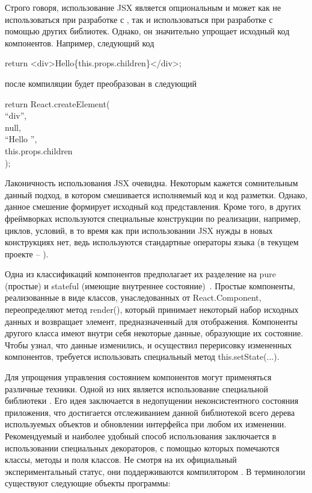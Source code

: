 Строго говоря, использование JSX является опциональным и может как не использоваться при разработке с \react, так и использоваться при разработке с помощью других библиотек. Однако, он значительно упрощает исходный код компонентов. Например, следующий \js код 
\begin{flushleft}
\qquad\qquad\qquad return <div>Hello\{this.props.children\}</div>;
\end{flushleft}
после компиляции будет преобразован в следующий
\begin{flushleft}
\qquad\qquad\qquad return React.createElement(\\
\qquad\qquad\qquad\qquad ``div'',\\
\qquad\qquad\qquad\qquad null,\\
\qquad\qquad\qquad\qquad ``Hello '',\\
\qquad\qquad\qquad\qquad this.props.children\\
\qquad\qquad\qquad );
\end{flushleft}

Лаконичность использования JSX очевидна. Некоторым кажется сомнительным данный подход, в котором смешивается исполняемый код и код разметки. Однако, данное смешение формирует исходный код представления. Кроме того, в других фреймворках используются специальные конструкции по реализации, например, циклов, условий, в то время как при использовании JSX нужды в новых конструкциях нет, ведь используются стандартные операторы языка \js (в текущем проекте -- \typescript).

Одна из классификаций компонентов \react предполагает их разделение на pure (простые) и stateful (имеющие внутреннее состояние)~\cite{react}. Простые компоненты, реализованные в виде классов, унаследованных от Re\-act.Com\-po\-nent, переопределяют метод render(), который принимает некоторый набор исходных данных и возвращает элемент, предназначенный для отображения. Компоненты другого класса имеют внутри себя некоторые данные, образующие их состояние. Чтобы \react узнал, что данные изменились, и осуществил перерисовку измененных компонентов, требуется использовать специальный метод this.setState(...). 

Для упрощения управления состоянием компонентов могут применяться различные техники. Одной из них является использование специальной библиотеки \mobx. Его идея заключается в недопущении неконсистентного состояния приложения, что достигается отслеживанием данной библиотекой всего дерева используемых объектов и обновлении интерфейса при любом их изменении. Рекомендуемый и наиболее удобный способ использования \mobx заключается в использовании специальных декораторов, с помощью которых помечаются классы, методы и поля классов. Не смотря на их официальный экспериментальный статус, они поддерживаются компилятором \typescript. В терминологии \mobx существуют следующие объекты программы:

